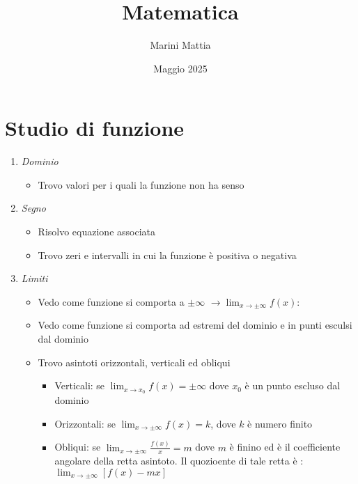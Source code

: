 \endofdump

\usetikzlibrary{external}
\tikzexternalize[prefix=tikz/]

\title{Matematica}
\author{Marini Mattia}
\date{Maggio 2025}


\maketitle
{}
\tableofcontents
\newpage
\section{Studio di funzione}
\begin{enumerate}
	\item \textit{Dominio}
	      \begin{itemize}
		      \item Trovo valori per i quali la funzione non ha senso
	      \end{itemize}
	\item \textit{Segno}
	      \begin{itemize}
		      \item Risolvo equazione associata
		      \item Trovo zeri e intervalli in cui la funzione è positiva o negativa
	      \end{itemize}
	\item \textit{Limiti}
	      \begin{itemize}
		      \item Vedo come funzione si comporta a $ \pm \infty $ $ \rightarrow \lim_{x \to \pm \infty} f(x) $:
		      \item Vedo come funzione si comporta ad estremi del dominio e in punti esculsi dal dominio
		      \item Trovo asintoti orizzontali, verticali ed obliqui
		            \begin{itemize}
			            \item Verticali: se $ \lim_{x \to x_0} f(x) = \pm \infty  $ dove $ x_0 $ è un punto escluso dal dominio
			            \item Orizzontali: se $ \lim_{x \to \pm\infty} f(x) = k $, dove $ k $ è numero finito
			            \item Obliqui: se $ \lim_{x \to \pm\infty} \frac{f(x)}{x} = m $ dove $ m $ è finino ed è il coefficiente angolare della retta asintoto. Il quozioente di tale retta è : $ \lim_{x \to \pm \infty} \left[f(x) - mx\right] $

\end{itemize}
\end{itemize}
\end{enumerate}
